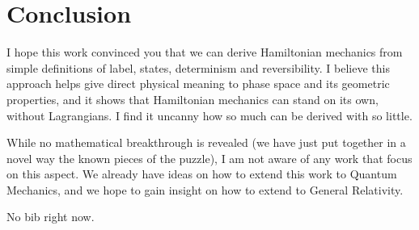 \documentclass[twocolumn,floatfix,nofootinbib]{revtex4}   %
\theoremstyle{theorem}
\theoremstyle{definition}
\begin{document}
\section{Conclusion}
I hope this work convinced you that we can derive Hamiltonian mechanics from simple definitions of label, states, determinism and reversibility. I believe this approach helps give direct physical meaning to phase space and its geometric properties, and it shows that Hamiltonian mechanics can stand on its own, without Lagrangians. I find it uncanny how so much can be derived with so little.

While no mathematical breakthrough is revealed (we have just put together in a novel way the known pieces of the puzzle), I am not aware of any work that focus on this aspect. We already have ideas on how to extend this work to Quantum Mechanics, and we hope to gain insight on how to extend to General Relativity.

\begin{thebibliography}{5}

 No bib right now.

\end{thebibliography}
\end{document}
